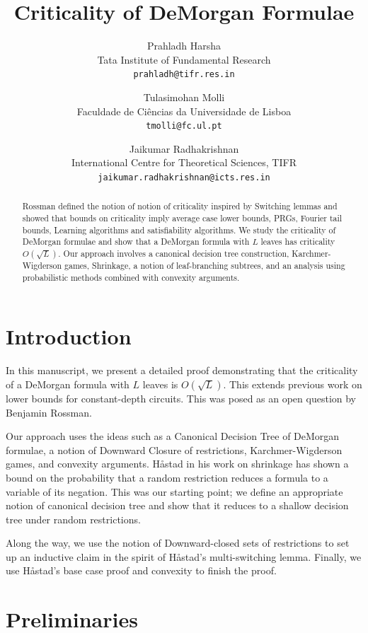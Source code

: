 \documentclass[11pt]{article}
\title{Criticality of DeMorgan Formulae}
\author{
    Prahladh Harsha \\
    \small Tata Institute of Fundamental Research \\
    \small \texttt{prahladh@tifr.res.in}
    \and
    Tulasimohan Molli \\
    \small Faculdade de Ciências da Universidade de Lisboa \\
    \small \texttt{tmolli@fc.ul.pt}
    \and
    Jaikumar Radhakrishnan \\
    \small International Centre for Theoretical Sciences, TIFR \\
    \small \texttt{jaikumar.radhakrishnan@icts.res.in}
}
\date{} %
\begin{document}
\maketitle

\begin{abstract}
    Rossman defined the notion of notion of criticality inspired by Switching lemmas and showed that bounds on criticality imply  average case lower bounds, PRGs, Fourier tail bounds, Learning algorithms and satisfiability algorithms. 
    We study the criticality of DeMorgan formulae and show that a DeMorgan formula with $L$ leaves has criticality $O(\sqrt{L})$. Our approach involves a canonical decision tree construction, Karchmer-Wigderson games, Shrinkage, a notion of leaf-branching subtrees, and an analysis using probabilistic methods combined with convexity arguments. 
\end{abstract}

\tableofcontents

\newpage

\section{Introduction}
\label{sec:introduction}

In this manuscript, we present a detailed proof demonstrating that the criticality of a DeMorgan formula with $L$ leaves is $O(\sqrt{L})$. This extends previous work on lower bounds for constant-depth circuits. This was posed as an open question by Benjamin Rossman.

Our approach uses the ideas such as a Canonical Decision Tree of DeMorgan formulae, a notion of Downward Closure of restrictions, Karchmer-Wigderson games, and convexity arguments. Håstad in his work on shrinkage has shown a bound on the probability that a random restriction reduces a formula to a variable of its negation. This was our starting point; we define an appropriate notion of canonical decision tree and show that it reduces to a shallow decision tree under random restrictions.

Along the way, we use the notion of Downward-closed sets of restrictions to set up an inductive claim in the spirit of Håstad's multi-switching lemma. Finally, we use Håstad's base case proof and convexity to finish the proof.

\section{Preliminaries}
\label{sec:preliminaries}
\end{document}
